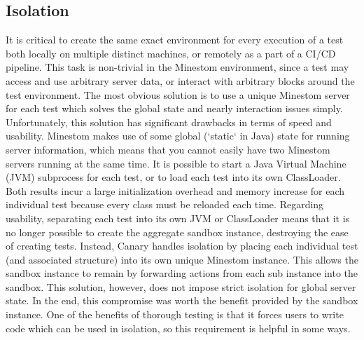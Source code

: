 \documentclass{article}
\begin{document}
\begin{doublespacing}
\subsection{Isolation}
It is critical to create the same exact environment for every execution of a test both locally on multiple distinct machines, or remotely as a part of a CI/CD pipeline. This task is non-trivial in the Minestom environment, since a test may access and use arbitrary server data, or interact with arbitrary blocks around the test environment. The most obvious solution is to use a unique Minestom server for each test which solves the global state and nearly interaction issues simply. Unfortunately, this solution has significant drawbacks in terms of speed and usability. Minestom makes use of some global (`static` in Java) state for running server information, which means that you cannot easily have two Minestom servers running at the same time. It is possible to start a Java Virtual Machine (JVM) subprocess for each test, or to load each test into its own ClassLoader. Both results incur a large initialization overhead and memory increase for each individual test because every class must be reloaded each time. Regarding usability, separating each test into its own JVM or ClassLoader means that it is no longer possible to create the aggregate sandbox instance, destroying the ease of creating tests. Instead, Canary handles isolation by placing each individual test (and associated structure) into its own unique Minestom instance. This allows the sandbox instance to remain by forwarding actions from each sub instance into the sandbox. This solution, however, does not impose strict isolation for global server state. In the end, this compromise was worth the benefit provided by the sandbox instance. One of the benefits of thorough testing is that it forces users to write code which can be used in isolation, so this requirement is helpful in some ways.





\end{doublespacing}
\end{document}
